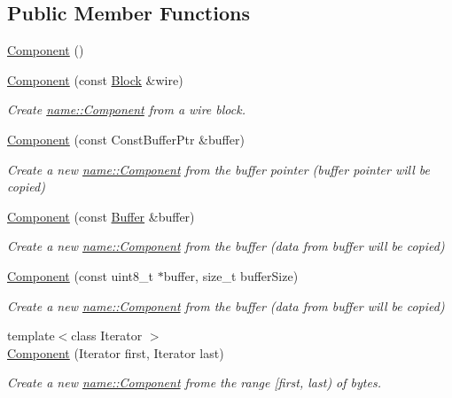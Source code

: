 \subsection*{Public Member Functions}
\begin{DoxyCompactItemize}
\item 
\hyperlink{classndn_1_1name_1_1Component_ad63b21d43607576a13a4b4a3117b161c}{Component} ()
\item 
\hyperlink{classndn_1_1name_1_1Component_ac0f32a97dc1437366660a8060c4791ab}{Component} (const \hyperlink{classndn_1_1Block}{Block} \&wire)
\begin{DoxyCompactList}\small\item\em Create \hyperlink{classndn_1_1name_1_1Component}{name\+::\+Component} from a wire block. \end{DoxyCompactList}\item 
\hyperlink{classndn_1_1name_1_1Component_a6b774677a2b7b02d357c8a73e1e1287f}{Component} (const Const\+Buffer\+Ptr \&buffer)
\begin{DoxyCompactList}\small\item\em Create a new \hyperlink{classndn_1_1name_1_1Component}{name\+::\+Component} from the buffer pointer (buffer pointer will be copied) \end{DoxyCompactList}\item 
\hyperlink{classndn_1_1name_1_1Component_a407c1d4c690d05564274c19b0440d5fa}{Component} (const \hyperlink{classndn_1_1Buffer}{Buffer} \&buffer)
\begin{DoxyCompactList}\small\item\em Create a new \hyperlink{classndn_1_1name_1_1Component}{name\+::\+Component} from the buffer (data from buffer will be copied) \end{DoxyCompactList}\item 
\hyperlink{classndn_1_1name_1_1Component_a85183824c2b1e292706435d42fdebad3}{Component} (const uint8\+\_\+t $\ast$buffer, size\+\_\+t buffer\+Size)
\begin{DoxyCompactList}\small\item\em Create a new \hyperlink{classndn_1_1name_1_1Component}{name\+::\+Component} from the buffer (data from buffer will be copied) \end{DoxyCompactList}\item 
{\footnotesize template$<$class Iterator $>$ }\\\hyperlink{classndn_1_1name_1_1Component_a912b748104361288e14629cce044da0b}{Component} (Iterator first, Iterator last)
\begin{DoxyCompactList}\small\item\em Create a new \hyperlink{classndn_1_1name_1_1Component}{name\+::\+Component} frome the range \mbox{[}{\ttfamily first}, {\ttfamily last}) of bytes. \end{DoxyCompactList}\item 

\end{DoxyCompactItemize}
